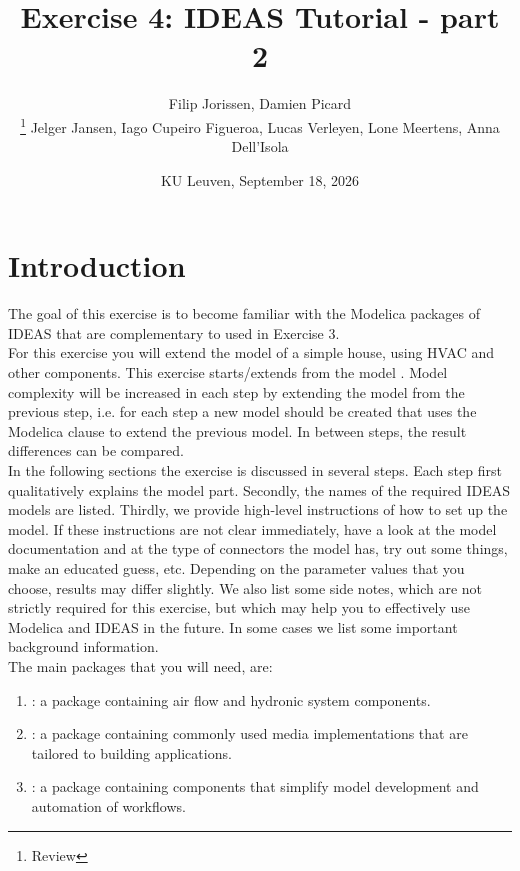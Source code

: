 \documentclass[10pt,a4paper]{article}
\begin{document}
\title{Exercise 4: IDEAS Tutorial - part 2}
\author{Filip Jorissen, Damien Picard\\ \thanks{Review} Jelger Jansen, Iago Cupeiro Figueroa, Lucas Verleyen, Lone Meertens, Anna Dell'Isola}
\date{KU Leuven, September 18, 2026}
\maketitle

\doclicenseThis

\section*{Introduction}
The goal of this exercise is to become familiar with the 
Modelica packages of IDEAS that are
complementary to  used in Exercise 3. \\

For this exercise you will extend the model of a simple house,
using HVAC and other components.
This exercise starts/extends from the model . 
Model complexity will be increased in each step by 
extending the model from the previous step, i.e. for each step a new model should be created that uses
the Modelica  clause to extend the previous model.
In between steps, the result differences can be compared.\\

In the following sections the exercise is discussed 
in several steps. 
Each step first qualitatively explains the model part.
Secondly, the names of the required IDEAS models 
are listed.
Thirdly, we provide high-level instructions of how to
set up the model.
If these instructions are not clear immediately, 
have a look at the model documentation and at the type of
connectors the model has, 
try out some things, 
make an educated guess, etc.
Depending on the parameter values that you choose, results
may differ slightly.
We also list some side notes, which are not strictly required for this
exercise, but which may help you to effectively use Modelica
and IDEAS in the future.
In some cases we list some important background information.\\

The main packages that you will need, are:
\begin{enumerate}
\item {}: a package containing air flow and hydronic system components.
\item {}: a package containing commonly used media implementations that are tailored to building applications.
\item {}: a package containing components that simplify model development and automation of workflows.
\end{enumerate}
\end{document}
